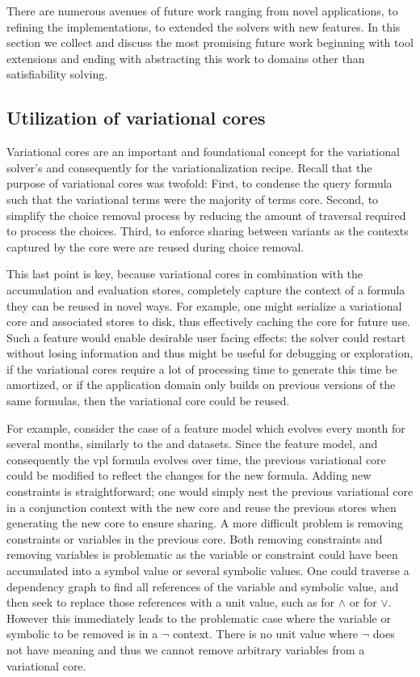 \label{section:conclusion:future-work}

There are numerous avenues of future work ranging from novel applications, to
refining the implementations, to extended the solvers with new features. In this
section we collect and discuss the most promising future work beginning with
tool extensions and ending with abstracting this work to domains other than
satisfiability solving.

\subsection{Utilization of variational cores}
Variational cores are an important and foundational concept for the variational
solver's and consequently for the variationalization recipe. Recall that the
purpose of variational cores was twofold: First, to condense the query formula
such that the variational terms were the majority of terms core. Second, to
simplify the choice removal process by reducing the amount of traversal required
to process the choices. Third, to enforce sharing between variants as the
contexts captured by the core were are reused during choice removal.

This last point is key, because variational cores in combination with the
accumulation and evaluation stores, completely capture the context of a formula
they can be reused in novel ways. For example, one might serialize a variational
core and associated stores to disk, thus effectively caching the core for future
use. Such a feature would enable desirable user facing effects: the solver could
restart without losing information and thus might be useful for debugging or
exploration, if the variational cores require a lot of processing time to
generate this time be amortized, or if the application domain only builds on
previous versions of the same formulas, then the variational core could be
reused.

For example, consider the case of a feature model which evolves every month for
several months, similarly to the \fin{} and \auto{} datasets. Since the feature
model, and consequently the \ac{vpl} formula evolves over time, the previous
variational core could be modified to reflect the changes for the new formula.
Adding new constraints is straightforward; one would simply nest the previous
variational core in a conjunction context with the new core and reuse the
previous stores when generating the new core to ensure sharing. A more difficult
problem is removing constraints or variables in the previous core. Both removing
constraints and removing variables is problematic as the variable or constraint
could have been accumulated into a symbol value or several symbolic values. One
could traverse a dependency graph to find all references of the variable and
symbolic value, and then seek to replace those references with a unit value,
such as \tru{} for $\wedge$ or \fls{} for $\vee$. However this immediately leads
to the problematic case where the variable or symbolic to be removed is in a
$\neg$ context. There is no unit value where $\neg$ does not have meaning and
thus we cannot remove arbitrary variables from a variational core.

